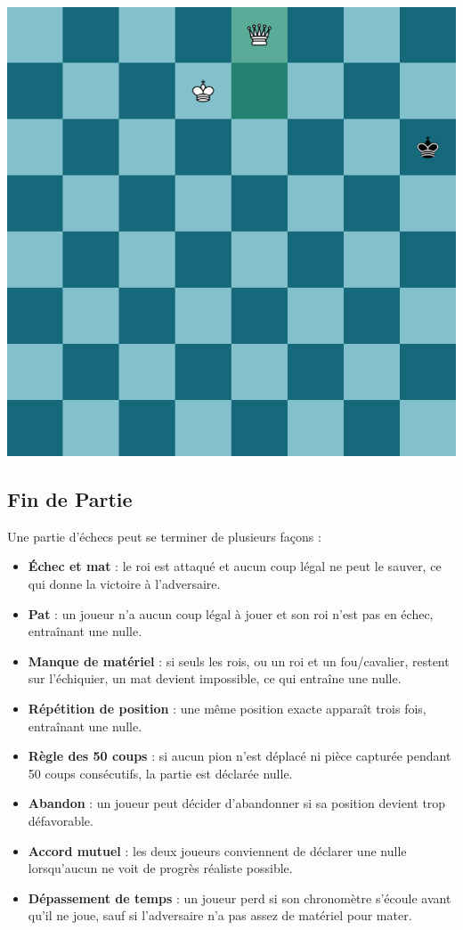 \documentclass{article}
\begin{document}
 \begin{minipage}{0.48\textwidth}
     \centering
     \includegraphics[width=\textwidth, height=\textwidth]{promotion2.png}
     \vspace{0.5cm}
 \end{minipage}

\subsection{Fin de Partie}
Une partie d'échecs peut se terminer de plusieurs façons :
\begin{itemize}
    \item \textbf{Échec et mat} : le roi est attaqué et aucun coup légal ne peut le sauver, ce qui donne la victoire à l'adversaire.
    \item \textbf{Pat} : un joueur n'a aucun coup légal à jouer et son roi n'est pas en échec, entraînant une nulle.
    \item \textbf{Manque de matériel} : si seuls les rois, ou un roi et un fou/cavalier, restent sur l'échiquier, un mat devient impossible, ce qui entraîne une nulle.
    \item \textbf{Répétition de position} : une même position exacte apparaît trois fois, entraînant une nulle.
    \item \textbf{Règle des 50 coups} : si aucun pion n'est déplacé ni pièce capturée pendant 50 coups consécutifs, la partie est déclarée nulle.
    \item \textbf{Abandon} : un joueur peut décider d'abandonner si sa position devient trop défavorable.
    \item \textbf{Accord mutuel} : les deux joueurs conviennent de déclarer une nulle lorsqu'aucun ne voit de progrès réaliste possible.
    \item \textbf{Dépassement de temps} : un joueur perd si son chronomètre s'écoule avant qu'il ne joue, sauf si l'adversaire n'a pas assez de matériel pour mater.
\end{itemize}
\end{document}
